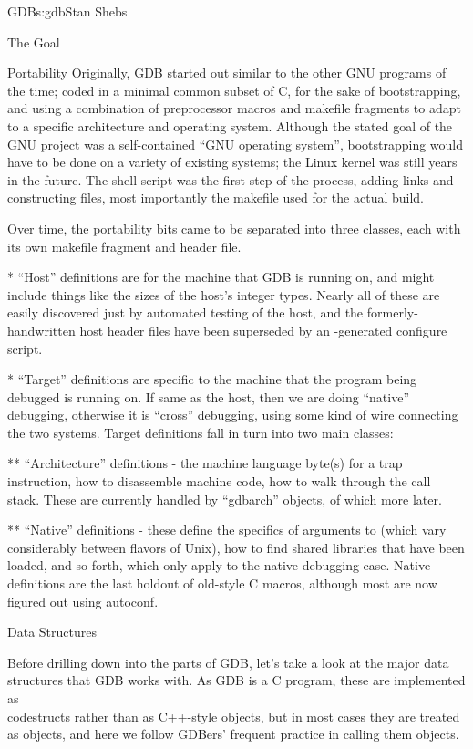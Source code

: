 \begin{aosachapter}{GDB}{s:gdb}{Stan Shebs}
\begin{aosasect1}{The Goal}
\begin{aosasect1}{Portability}
Originally, GDB started out similar to the other GNU programs of the
time; coded in a minimal common subset of C, for the sake of
bootstrapping, and using a combination of preprocessor macros and
makefile fragments to adapt to a specific architecture and operating
system.  Although the stated goal of the GNU project was a
self-contained ``GNU operating system'', bootstrapping would have to
be done on a variety of existing systems; the Linux kernel was still
years in the future.  The  shell script was the first
step of the process, adding links and constructing files, most
importantly the makefile used for the actual build.

Over time, the portability bits came to be separated into three
classes, each with its own makefile fragment and header file.

* ``Host'' definitions are for the machine that GDB is running on, and
might include things like the sizes of the host's integer types.
Nearly all of these are easily discovered just by automated testing of
the host, and the formerly-handwritten host header files have been
superseded by an -generated configure script.

* ``Target'' definitions are specific to the machine that the program
being debugged is running on.  If same as the host, then we are doing
``native'' debugging, otherwise it is ``cross'' debugging, using some
kind of wire connecting the two systems.  Target definitions fall in
turn into two main classes:

** ``Architecture'' definitions - the machine language byte(s) for a
trap instruction, how to disassemble machine code, how to walk
through the call stack.  These are currently handled by ``gdbarch''
objects, of which more later.

** ``Native'' definitions - these define the specifics of arguments to
 (which vary considerably between flavors of Unix), how to
find shared libraries that have been loaded, and so forth, which only
apply to the native debugging case.  Native definitions are the last
holdout of old-style C macros, although most are now figured out using
autoconf.

\end{aosasect1}

\begin{aosasect1}{Data Structures}

Before drilling down into the parts of GDB, let's take a look at the
major data structures that GDB works with.  As GDB is a C program,
these are implemented as \\code{struct}s rather than as C++-style objects, but
in most cases they are treated as objects, and here we follow GDBers'
frequent practice in calling them objects.


\end{aosasect1}
\end{aosasect1}
\end{aosachapter}
